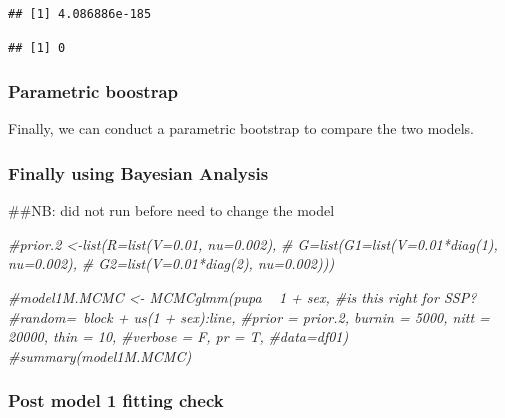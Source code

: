 \documentclass[
]{article}
\newenvironment{Shaded}{\begin{snugshade}}{\end{snugshade}}
\newcommand{\CommentTok}[1]{\textcolor[rgb]{0.56,0.35,0.01}{\textit{#1}}}
\newcommand{\DataTypeTok}[1]{\textcolor[rgb]{0.13,0.29,0.53}{#1}}
\newcommand{\KeywordTok}[1]{\textcolor[rgb]{0.13,0.29,0.53}{\textbf{#1}}}
\newcommand{\NormalTok}[1]{#1}
\newcommand{\OperatorTok}[1]{\textcolor[rgb]{0.81,0.36,0.00}{\textbf{#1}}}
\begin{document}
\begin{verbatim}
## [1] 4.086886e-185
\end{verbatim}

\begin{Shaded}
\end{Shaded}

\begin{verbatim}
## [1] 0
\end{verbatim}

\hypertarget{parametric-boostrap-3}{%
\subsubsection{Parametric boostrap}\label{parametric-boostrap-3}}

Finally, we can conduct a parametric bootstrap to compare the two
models.

\hypertarget{finally-using-bayesian-analysis-3}{%
\subsubsection{Finally using Bayesian
Analysis}\label{finally-using-bayesian-analysis-3}}

\#\#NB: did not run before need to change the model

\begin{Shaded}
\begin{Highlighting}[]
\CommentTok{#prior.2 <-list(R=list(V=0.01, nu=0.002), }
  \CommentTok{#             G=list(G1=list(V=0.01*diag(1), nu=0.002),}
   \CommentTok{#                   G2=list(V=0.01*diag(2), nu=0.002)))}

\CommentTok{#model1M.MCMC <- MCMCglmm(pupa ~ 1 + sex, #is this right for SSP?}
  \CommentTok{#random=~block + us(1 + sex):line,}
  \CommentTok{#prior = prior.2, burnin = 5000, nitt = 20000, thin = 10,}
  \CommentTok{#verbose = F, pr = T,}
  \CommentTok{#data=df01)}
\CommentTok{#summary(model1M.MCMC)}
\end{Highlighting}
\end{Shaded}

\hypertarget{post-model-1-fitting-check-3}{%
\subsubsection{Post model 1 fitting
check}\label{post-model-1-fitting-check-3}}
\end{document}
